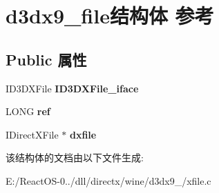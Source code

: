\hypertarget{structd3dx9__file}{}\section{d3dx9\+\_\+file结构体 参考}
\label{structd3dx9__file}
\subsection*{Public 属性}
\begin{DoxyCompactItemize}
\item 
\mbox{\label{structd3dx9__file_a6b30816555f5fe138106b08db3d2713f}} 
I\+D3\+D\+X\+File {\bfseries I\+D3\+D\+X\+File\+\_\+iface}
\item 
\mbox{\label{structd3dx9__file_a755b406cf331f8d55761da56d9b9d527}} 
L\+O\+NG {\bfseries ref}
\item 
\mbox{\label{structd3dx9__file_a504895a55fb1af213b6d9a52cf846a70}} 
I\+Direct\+X\+File $\ast$ {\bfseries dxfile}
\end{DoxyCompactItemize}


该结构体的文档由以下文件生成\+:\begin{DoxyCompactItemize}
\item 
E\+:/\+React\+O\+S-\/0../dll/directx/wine/d3dx9\+\_/xfile.\+c\end{DoxyCompactItemize}
